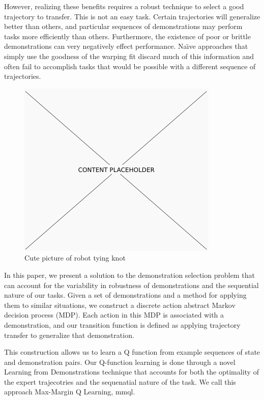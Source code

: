 However, realizing these benefits requires a robust technique to select a good trajectory to
transfer.
This is not an easy task.
Certain trajectories will generalize better than others, and particular sequences of 
demonstrations may perform tasks more efficiently than others.
Furthermore, the existence of poor or brittle demonstrations can very negatively 
effect performance.
Na\"{\i}ve approaches that simply use the goodness of the warping fit discard much of this information and often fail to accomplish tasks that would be possible with a different sequence of trajectories.

\begin{figure}[t]
  \centering
    \includegraphics[width=0.9\linewidth]{figures/placeholder.png}
  \caption{Cute picture of robot tying knot}
  \label{fig:frontfig}
\end{figure}

In this paper, we present a solution to the demonstration selection problem that
can account for the variability in robustness of demonstrations and the
sequential nature of our tasks.  Given a set of demonstrations and a method for
applying them to similar situations, we construct a discrete action abstract
Markov decision process (MDP).  Each action in this MDP is associated with a
demonstration, and our transition function is defined as applying trajectory
transfer to generalize that demonstration.

This construction allows us to learn a Q function from example sequences of 
state and demonstration pairs.
Our Q-function learning is done through a novel Learning from Demonstrations
technique that accounts for both the optimality of the expert trajecotries and the
sequenatial nature of the task.
We call this approach Max-Margin Q Learning, {\sc mmql}.

